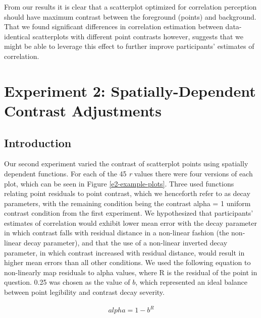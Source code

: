 \documentclass[preprint, 3p,
authoryear]{elsarticle} %
\begin{document}
From our results it is clear that a scatterplot optimized for
correlation perception should have maximum contrast between the
foreground (points) and background. That we found significant
differences in correlation estimation between data-identical
scatterplots with different point contrasts however, suggests that we
might be able to leverage this effect to further improve participants'
estimates of correlation.

\hypertarget{experiment-2-spatially-dependent-contrast-adjustments}{%
\section{Experiment 2: Spatially-Dependent Contrast
Adjustments}\label{experiment-2-spatially-dependent-contrast-adjustments}}

\hypertarget{introduction-2}{%
\subsection{Introduction}\label{introduction-2}}

Our second experiment varied the contrast of scatterplot points using
spatially dependent functions. For each of the 45 \emph{r} values there
were four versions of each plot, which can be seen in Figure
\ref{e2-example-plots}. Three used functions relating point residuals to
point contrast, which we henceforth refer to as decay parameters, with
the remaining condition being the contrast alpha = 1 uniform contrast
condition from the first experiment. We hypothesized that participants'
estimates of correlation would exhibit lower mean error with the decay
parameter in which contrast falls with residual distance in a non-linear
fashion (the non-linear decay parameter), and that the use of a
non-linear inverted decay parameter, in which contrast increased with
residual distance, would result in higher mean errors than all other
conditions. We used the following equation to non-linearly map residuals
to alpha values, where R is the residual of the point in question. 0.25
was chosen as the value of \(b\), which represented an ideal balance
between point legibility and contrast decay severity.

\begin{align}
  alpha = 1 - b^R
\end{align}
\end{document}
